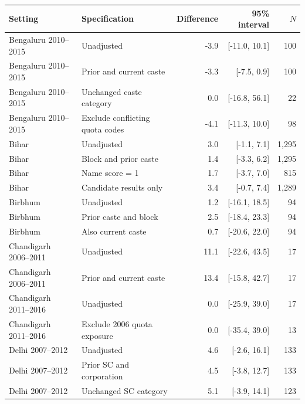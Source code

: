 \begin{tabular}{llrrr}
\toprule
Setting & Specification & Difference & 95\% interval & $N$ \\
\midrule
Bengaluru 2010--2015 & Unadjusted & -3.9 & [-11.0, 10.1] & 100 \\
Bengaluru 2010--2015 & Prior and current caste & -3.3 & [-7.5, 0.9] & 100 \\
Bengaluru 2010--2015 & Unchanged caste category & 0.0 & [-16.8, 56.1] & 22 \\
Bengaluru 2010--2015 & Exclude conflicting quota codes & -4.1 & [-11.3, 10.0] & 98 \\
Bihar & Unadjusted & 3.0 & [-1.1, 7.1] & 1,295 \\
Bihar & Block and prior caste & 1.4 & [-3.3, 6.2] & 1,295 \\
Bihar & Name score = 1 & 1.7 & [-3.7, 7.0] & 815 \\
Bihar & Candidate results only & 3.4 & [-0.7, 7.4] & 1,289 \\
Birbhum & Unadjusted & 1.2 & [-16.1, 18.5] & 94 \\
Birbhum & Prior caste and block & 2.5 & [-18.4, 23.3] & 94 \\
Birbhum & Also current caste & 0.7 & [-20.6, 22.0] & 94 \\
Chandigarh 2006--2011 & Unadjusted & 11.1 & [-22.6, 43.5] & 17 \\
Chandigarh 2006--2011 & Prior and current caste & 13.4 & [-15.8, 42.7] & 17 \\
Chandigarh 2011--2016 & Unadjusted & 0.0 & [-25.9, 39.0] & 17 \\
Chandigarh 2011--2016 & Exclude 2006 quota exposure & 0.0 & [-35.4, 39.0] & 13 \\
Delhi 2007--2012 & Unadjusted & 4.6 & [-2.6, 16.1] & 133 \\
Delhi 2007--2012 & Prior SC and corporation & 4.5 & [-3.8, 12.7] & 133 \\
Delhi 2007--2012 & Unchanged SC category & 5.1 & [-3.9, 14.1] & 123 \\
\bottomrule
\end{tabular}
